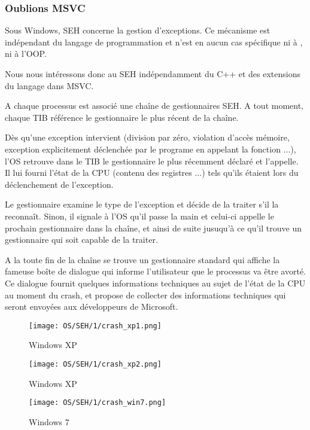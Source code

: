 ﻿\subsubsection{Oublions MSVC}

Sous Windows, \ac{SEH} concerne la gestion d'exceptions. Ce mécanisme est indépendant du langage 
de programmation et n'est en aucun cas spécifique ni à \Cpp, ni à l'\ac{OOP}.

Nous nous intéressons donc au \ac{SEH} indépendamment du C++ et des extensions du langage dans MSVC.


A chaque processus est associé une chaîne de gestionnaires \ac{SEH}. A tout moment, chaque \ac{TIB} 
référence le gestionnaire le plus récent de la chaîne.

Dès qu'une exception intervient (division par zéro, violation d'accès mémoire, exception explicitement 
déclenchée par le programe en appelant la fonction  ...), l'OS retrouve dans le 
\ac{TIB} le gestionnaire le plus récemment déclaré et l'appelle. Il lui fourni l'état de la \ac{CPU} 
(contenu des registres ...) tels qu'ils étaient lors du déclenchement de l'exception.

Le gestionnaire examine le type de l'exception et décide de la traiter s'il la reconnaît. Sinon, il 
signale à l'\ac{OS} qu'il passe la main et celui-ci appelle le prochain gestionnaire dans la chaîne, 
et ainsi de suite jusuqu'à ce qu'il trouve un gestionnaire qui soit capable de la traiter.

A la toute fin de la chaîne se trouve un gestionnaire standard qui affiche la fameuse boîte de 
dialogue qui informe l'utilisateur que le processus va être avorté. Ce dialogue fournit quelques
informations techniques au sujet de l'état de la \ac{CPU} au moment du crash, et propose de collecter 
des informations techniques qui seront envoyées aux développeurs de Microsoft. 

\begin{figure}[H]
\centering
\texttt{[image: OS/SEH/1/crash\_xp1.png]}
\caption{Windows XP}
\end{figure}

\begin{figure}[H]
\centering
\texttt{[image: OS/SEH/1/crash\_xp2.png]}
\caption{Windows XP}
\end{figure}

\begin{figure}[H]
\centering
\texttt{[image: OS/SEH/1/crash\_win7.png]}
\caption{Windows 7}
\end{figure}

